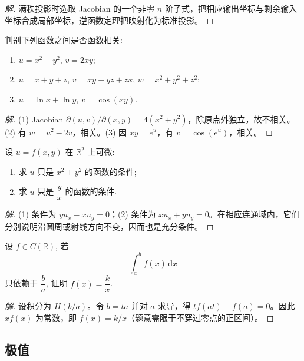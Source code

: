 \documentclass[../../数学分析培优讲义(答案版).tex]{subfiles}
\begin{document}
\begin{proof}[解]
满秩投影时选取 Jacobian 的一个非零 $n$ 阶子式，把相应输出坐标与剩余输入坐标合成局部坐标，逆函数定理把映射化为标准投影。
\end{proof}


\begin{example}
判别下列函数之间是否函数相关:
\begin{enumerate}[label=(\arabic*)]
    \item $u=x^2-y^2$, $v=2xy$;
    \item $u=x+y+z$, $v=xy+yz+zx$, $w=x^2+y^2+z^2$;
    \item $u=\ln x+\ln y$, $v=\cos(xy)$.
\end{enumerate}
\end{example}

\begin{proof}[解]
(1) Jacobian $\partial(u,v)/\partial(x,y)=4(x^2+y^2)$，除原点外独立，故不相关。(2) 有 $w=u^2-2v$，相关。(3) 因 $xy=e^u$，有 $v=\cos(e^u)$，相关。
\end{proof}

\begin{example}
设 $u=f(x,y)$ 在 $\mathbb{R}^2$ 上可微:
\begin{enumerate}[label=(\arabic*)]
    \item 求 $u$ 只是 $x^2+y^2$ 的函数的条件;
    \item 求 $u$ 只是 $\dfrac{y}{x}$ 的函数的条件.
\end{enumerate}
\end{example}

\begin{proof}[解]
(1) 条件为 $yu_x-xu_y=0$；(2) 条件为 $xu_x+yu_y=0$。在相应连通域内，它们分别说明沿圆周或射线方向不变，因而也是充分条件。
\end{proof}

\begin{example}
设 $f\in C(\mathbb{R})$, 若
\[
    \int_a^bf(x)\,\mathrm{d}x
\]
只依赖于 $\dfrac{b}{a}$, 证明 $f(x)=\dfrac{k}{x}$.
\end{example}

\begin{proof}[解]
设积分为 $H(b/a)$。令 $b=ta$ 并对 $a$ 求导，得 $t f(at)-f(a)=0$。因此 $xf(x)$ 为常数，即 $f(x)=k/x$（题意需限于不穿过零点的正区间）。
\end{proof}

\subsection{极值}
\end{document}
